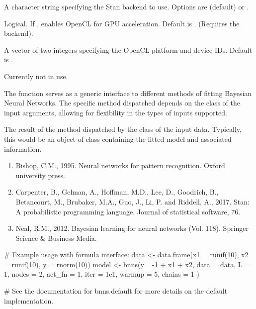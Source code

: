 \documentclass[a4paper]{book}
\begin{document}
\begin{Arguments}
\begin{ldescription}
\item[\code{backend}] A character string specifying the Stan backend to use. Options are  (default) or .

\item[\code{use\_gpu}] Logical. If , enables OpenCL for GPU acceleration. Default is . (Requires the  backend).

\item[\code{opencl\_ids}] A vector of two integers specifying the OpenCL platform and device IDs. Default is .

\item[\code{...}] Currently not in use.
\end{ldescription}
\end{Arguments}
%
\begin{Details}
The function serves as a generic interface to different methods of fitting Bayesian Neural Networks. The specific method dispatched depends on the class of the input arguments, allowing for flexibility in the types of inputs supported.
\end{Details}
%
\begin{Value}
The result of the method dispatched by the class of the input data. Typically, this would be an object of class  containing the fitted model and associated information.
\end{Value}
%
\begin{References}
\begin{enumerate}

\item{} Bishop, C.M., 1995. Neural networks for pattern recognition. Oxford university press.
\item{} Carpenter, B., Gelman, A., Hoffman, M.D., Lee, D., Goodrich, B., Betancourt, M., Brubaker, M.A., Guo, J., Li, P. and Riddell, A., 2017. Stan: A probabilistic programming language. Journal of statistical software, 76.
\item{} Neal, R.M., 2012. Bayesian learning for neural networks (Vol. 118). Springer Science \& Business Media.

\end{enumerate}

\end{References}
%
\begin{SeeAlso}
\end{SeeAlso}
%
\begin{Examples}
\begin{ExampleCode}

# Example usage with formula interface:
data <- data.frame(x1 = runif(10), x2 = runif(10), y = rnorm(10))
model <- bnns(y ~ -1 + x1 + x2,
  data = data, L = 1, nodes = 2, act_fn = 1,
  iter = 1e1, warmup = 5, chains = 1
)

# See the documentation for bnns.default for more details on the default implementation.

\end{ExampleCode}
\end{Examples}
\end{document}
